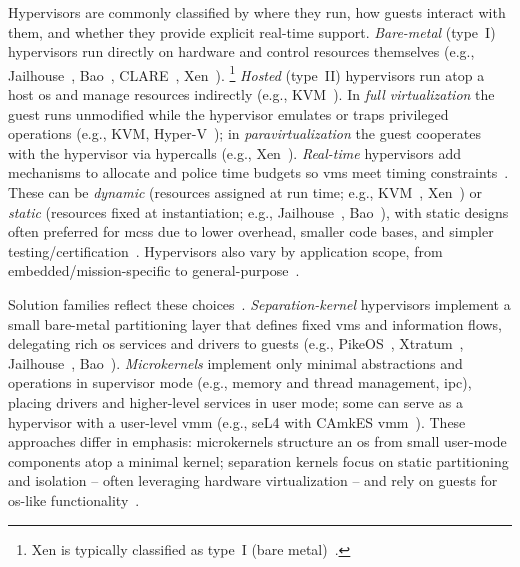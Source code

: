 Hypervisors are commonly classified by where they run, how guests interact with
them, and whether they provide explicit real-time support. \emph{Bare-metal} (type~I)
hypervisors run directly on hardware and control resources themselves (e.g.,
Jailhouse~\cite{jailhouse}, Bao~\cite{martins_et_al:OASIcs:2020:11779},
CLARE~\cite{clare-home}, Xen~\cite{xen-home}).%
\footnote{Xen is typically classified as type~I (bare metal)~\cite{cinque2022virtualizing}.}
\emph{Hosted} (type~II) hypervisors run atop a host \gls{os} and manage resources
indirectly (e.g., KVM~\cite{kivity2007kvm}). In \emph{full virtualization} the
guest runs unmodified while the hypervisor emulates or traps privileged operations (e.g.,
KVM, Hyper-V~\cite{microsoftHyperV}); in \emph{paravirtualization} the guest
cooperates with the hypervisor via hypercalls (e.g., Xen~\cite{barham2003xen}).
\emph{Real-time} hypervisors add mechanisms to allocate and police time budgets so \glspl{vm}
meet timing constraints~\cite{cinque2022virtualizing}. These can be \emph{dynamic}
(resources assigned at run time; e.g., KVM~\cite{kivity2007kvm}, Xen~\cite{barham2003xen})
or \emph{static} (resources fixed at instantiation; e.g., Jailhouse~\cite{jailhouse}, Bao~\cite{martins_et_al:OASIcs:2020:11779}),
with static designs often preferred for \glspl{mcs} due to lower overhead, smaller
code bases, and simpler testing/certification~\cite{cinque2022virtualizing}. Hypervisors also vary by
application scope, from embedded/mission-specific to general-purpose~\cite{heiser2008role}.

Solution families reflect these choices~\cite{cinque2022virtualizing}. \emph{Separation-kernel}
hypervisors implement a small bare-metal partitioning layer that defines fixed
\glspl{vm} and information flows, delegating rich \gls{os} services and drivers to
guests (e.g., PikeOS~\cite{pikeOS}, Xtratum~\cite{masmano2009xtratum}, Jailhouse~\cite{jailhouse},
Bao~\cite{martins_et_al:OASIcs:2020:11779}). \emph{Microkernels} implement only minimal abstractions and
operations in supervisor mode (e.g., memory and thread management, \gls{ipc}), placing
drivers and higher-level services in user mode; some can serve as a hypervisor
with a user-level \gls{vmm} (e.g., seL4 with CAmkES \gls{vmm}~\cite{klein_sel4_2009,matos_sel4_2022}).
These approaches differ in emphasis: microkernels structure an \gls{os} from small user-mode components atop a minimal kernel; separation kernels
focus on static partitioning and isolation -- often leveraging hardware
virtualization -- and rely on guests for \gls{os}-like functionality~\cite{cinque2022virtualizing}.%

